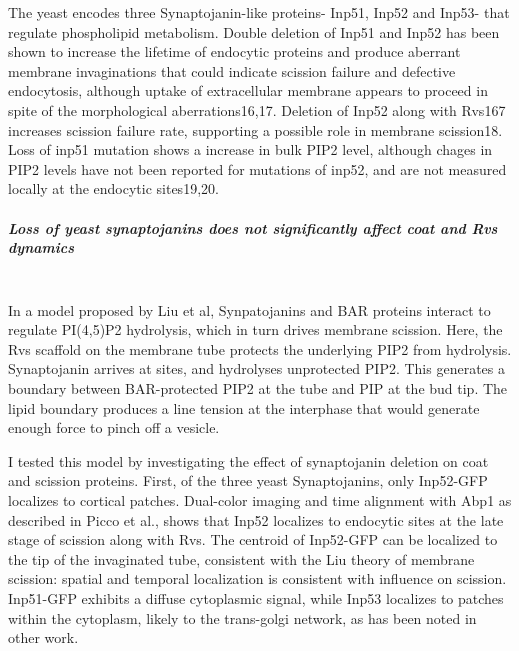 	\vspace{5mm}
	The yeast encodes three Synaptojanin-like proteins- Inp51, Inp52 and Inp53- that regulate phospholipid metabolism. Double deletion of Inp51 and Inp52 has been shown to increase the lifetime of endocytic proteins and produce aberrant membrane invaginations that could indicate scission failure and defective endocytosis, although uptake of extracellular membrane appears to proceed in spite of the morphological aberrations16,17. Deletion of Inp52 along with Rvs167 increases scission failure rate, supporting a possible role in membrane scission18. Loss of inp51 mutation shows a increase in bulk PIP2 level, although chages in PIP2 levels have not been reported for mutations of inp52, and are not measured locally at the endocytic sites19,20.

	\subparagraph{Loss of yeast synaptojanins does not significantly affect coat and Rvs dynamics}
	\mbox{}\\
	In a model proposed by Liu et al, Synpatojanins and BAR proteins interact to regulate PI(4,5)P2 hydrolysis, which in turn drives membrane scission. Here, the Rvs scaffold on the membrane tube protects the underlying PIP2 from hydrolysis. Synaptojanin arrives at sites, and hydrolyses unprotected PIP2. This generates a boundary between BAR-protected PIP2 at the tube and PIP at the bud tip. The lipid boundary produces a line tension at the interphase that would generate enough force to pinch off a vesicle. 
		
	I tested this model by investigating the effect of synaptojanin deletion on coat and scission proteins. First, of the three yeast Synaptojanins, only Inp52-GFP localizes to cortical patches. Dual-color imaging and time alignment with Abp1 as described in Picco et al., shows that Inp52 localizes to endocytic sites at the late stage of scission along with Rvs. The centroid of Inp52-GFP can be localized to the tip of the invaginated tube, consistent with the Liu theory of membrane scission: spatial and temporal localization is consistent with influence on scission. Inp51-GFP exhibits a diffuse cytoplasmic signal, while Inp53 localizes to patches within the cytoplasm, likely to the trans-golgi network, as has been noted in other work. 


